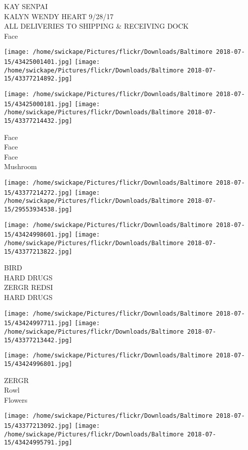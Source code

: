 \documentclass[10pt,letterpaper]{article}
\begin{document}
KAY SENPAI\\
KALYN WENDY HEART 9/28/17\\
ALL DELIVERIES TO SHIPPING \& RECEIVING DOCK\\
Face
\pagebreak

\texttt{[image: /home/swickape/Pictures/flickr/Downloads/Baltimore 2018-07-15/43425001401.jpg]}
\texttt{[image: /home/swickape/Pictures/flickr/Downloads/Baltimore 2018-07-15/43377214892.jpg]}

\texttt{[image: /home/swickape/Pictures/flickr/Downloads/Baltimore 2018-07-15/43425000181.jpg]}
\texttt{[image: /home/swickape/Pictures/flickr/Downloads/Baltimore 2018-07-15/43377214432.jpg]}

Face\\
Face\\
Face\\
Mushroom
\pagebreak

\texttt{[image: /home/swickape/Pictures/flickr/Downloads/Baltimore 2018-07-15/43377214272.jpg]}
\texttt{[image: /home/swickape/Pictures/flickr/Downloads/Baltimore 2018-07-15/29553934538.jpg]}

\texttt{[image: /home/swickape/Pictures/flickr/Downloads/Baltimore 2018-07-15/43424998601.jpg]}
\texttt{[image: /home/swickape/Pictures/flickr/Downloads/Baltimore 2018-07-15/43377213822.jpg]}

BIRD\\
HARD DRUGS\\
ZERGR REDSI\\
HARD DRUGS
\pagebreak

\texttt{[image: /home/swickape/Pictures/flickr/Downloads/Baltimore 2018-07-15/43424997711.jpg]}
\texttt{[image: /home/swickape/Pictures/flickr/Downloads/Baltimore 2018-07-15/43377213442.jpg]}

\vspace{0.25in}
\texttt{[image: /home/swickape/Pictures/flickr/Downloads/Baltimore 2018-07-15/43424996801.jpg]}

ZERGR\\
Rowl\\
Flowers
\pagebreak

\texttt{[image: /home/swickape/Pictures/flickr/Downloads/Baltimore 2018-07-15/43377213092.jpg]}
\texttt{[image: /home/swickape/Pictures/flickr/Downloads/Baltimore 2018-07-15/43424995791.jpg]}
\end{document}
